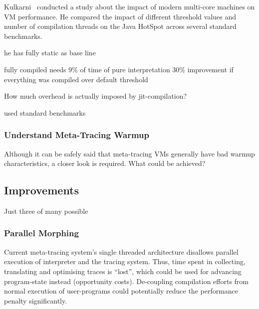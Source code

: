 Kulkarni~\cite{kulkarni2011jit} conducted a study about the impact of modern
multi-core machines on VM performance. He compared the impact of different
threshold values and number of compilation threads on the Java HotSpot across
several standard benchmarks. 

he has fully static as base line

fully compiled needs 9\% of time of pure interpretation
30\% improvement if everything was compiled over default threshold



How much overhead is actually imposed by jit-compilation?

used standard benchmarks


\subsubsection{Understand Meta-Tracing Warmup}

Although it can be safely said that meta-tracing VMs generally have bad warmup
characteristics, a closer look is required. What could be achieved?



\subsection{Improvements}

Just three of many possible

\subsubsection{Parallel Morphing} Current meta-tracing system's single threaded
architecture disallows parallel execution of interpreter and the tracing system.
Thus, time spent in collecting, translating and optimising traces is ``lost'',
which could be used for advancing program-state instead (opportunity costs).
De-coupling compilation efforts from normal execution of user-programs could
potentially reduce the performance penalty significantly.



